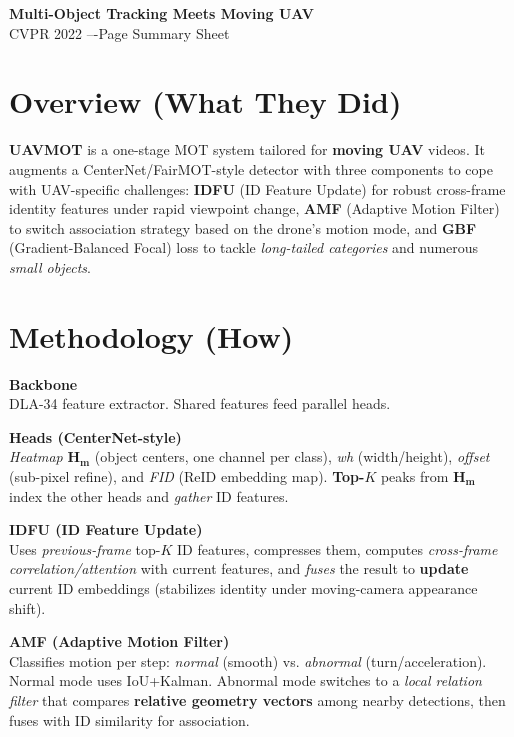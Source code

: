 \documentclass[10pt]{article}
\begin{document}
\small
\begin{center}
  {\LARGE \textbf{Multi-Object Tracking Meets Moving UAV}\\}
  {\large CVPR 2022 \;---Page Summary Sheet}
\end{center}

\section*{Overview (What They Did)}
\textbf{UAVMOT} is a one-stage MOT system tailored for \textbf{moving UAV} videos. It augments a CenterNet/FairMOT-style detector with three components to cope with UAV-specific challenges: \textbf{IDFU} (ID Feature Update) for robust cross-frame identity features under rapid viewpoint change, \textbf{AMF} (Adaptive Motion Filter) to switch association strategy based on the drone's motion mode, and \textbf{GBF} (Gradient-Balanced Focal) loss to tackle \textit{long-tailed categories} and numerous \textit{small objects}.

\section*{Methodology (How)}
\textbf{Backbone \\}
\quad DLA-34 feature extractor. Shared features feed parallel heads.

\textbf{Heads (CenterNet-style) \\}
\quad \textit{Heatmap} $\mathbf{H_m}$ (object centers, one channel per class), \textit{wh} (width/height), \textit{offset} (sub-pixel refine), and \textit{FID} (ReID embedding map). \textbf{Top-$K$} peaks from $\mathbf{H_m}$ index the other heads and \emph{gather} ID features.

\textbf{IDFU (ID Feature Update) \\}
\quad Uses \emph{previous-frame} top-$K$ ID features, compresses them, computes \emph{cross-frame correlation/attention} with current features, and \emph{fuses} the result to \textbf{update} current ID embeddings (stabilizes identity under moving-camera appearance shift).

\textbf{AMF (Adaptive Motion Filter) \\}
\quad Classifies motion per step: \emph{normal} (smooth) vs. \emph{abnormal} (turn/acceleration). Normal mode uses IoU+Kalman. Abnormal mode switches to a \emph{local relation filter} that compares \textbf{relative geometry vectors} among nearby detections, then fuses with ID similarity for association.
\end{document}
